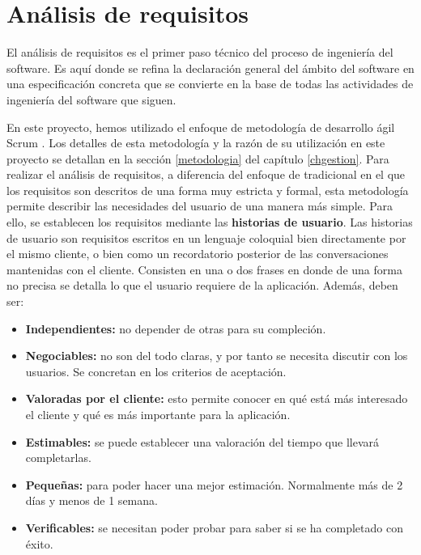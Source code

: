 
\chapter{Análisis de requisitos} \label{analisisreq}
El análisis de requisitos es el primer paso técnico del proceso de ingeniería del software. Es aquí donde se refina la declaración general del ámbito del software en una especificación concreta que se convierte en la base de todas las actividades de ingeniería del software que siguen.

En este proyecto, hemos utilizado el enfoque de metodología de desarrollo ágil Scrum \cite{libroscrum}. Los detalles de esta metodología y la razón de su utilización en este proyecto se detallan en la sección \ref{metodologia} del capítulo \ref{chgestion}. Para realizar el análisis de requisitos, a diferencia del enfoque de tradicional en el que los requisitos son descritos de una forma muy estricta y formal, esta metodología permite describir las necesidades del usuario de una manera más simple. Para ello, se establecen los requisitos mediante las \textbf{historias de usuario}. Las historias de usuario son requisitos escritos en un lenguaje coloquial bien directamente por el mismo cliente, o bien como un recordatorio posterior de las conversaciones mantenidas con el cliente. Consisten en una o dos frases en donde de una forma no precisa se detalla lo que el usuario requiere de la aplicación. Además, deben ser:

\begin{itemize}
\item \textbf{Independientes:} no depender de otras para su compleción.
\item \textbf{Negociables:} no son del todo claras, y por tanto se necesita discutir con los usuarios. Se concretan en los criterios de aceptación.
\item \textbf{Valoradas por el cliente:} esto permite conocer en qué está más interesado el cliente y qué es más importante para la aplicación.
\item \textbf{Estimables:} se puede establecer una valoración del tiempo que llevará completarlas.
\item \textbf{Pequeñas:} para poder hacer una mejor estimación. Normalmente más de 2 días y menos de 1 semana.
\item \textbf{Verificables:} se necesitan poder probar para saber si se ha completado con éxito. 
\end{itemize}

